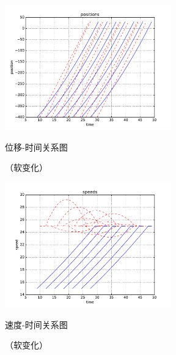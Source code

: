 \begin{figure}[htbp]
\begin{minipage}{0.48\textwidth}
  \centering
  \includegraphics[height=5.4cm]{figures/sim_case4/posi.pdf}
  \caption{位移-时间关系图}
  \caption*{\small （软变化）}
  \label{fig:case4:posi}
\end{minipage}\hfill
\begin{minipage}{0.48\textwidth}
  \centering
  \includegraphics[height=5.4cm]{figures/sim_case4/speed.pdf}
  \caption{速度-时间关系图}
  \caption*{\small （软变化）}
  \label{fig:case4:speed}
\end{minipage}
\end{figure}
